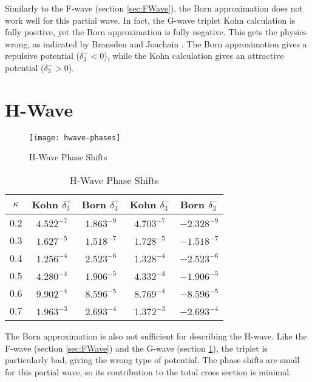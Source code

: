 \documentclass[Dissertation.tex]{subfiles}
\begin{document}
Similarly to the F-wave (section \ref{sec:FWave}), the Born approximation does not work well for this partial wave. In fact, the G-wave triplet Kohn calculation is fully positive, yet the Born approximation is fully negative. This gets the physics wrong, as indicated by Bransden and Joachain \citep[pg. 589]{Bransden2003}. The Born approximation gives a repulsive potential ($\delta_3^- < 0$), while the Kohn calculation gives an attractive potential ($\delta_3^- > 0$).


\section{H-Wave}
\label{sec:HWave}

\begin{figure}[H]
	\centering
	\texttt{[image: hwave-phases]}
	\caption{H-Wave Phase Shifts}
	\label{fig:HWavePhase}
\end{figure}

\setlength{\abovecaptionskip}{6pt}
\setlength{\belowcaptionskip}{6pt}
\begin{table}[H]
\centering
\begin{tabular}{c | c c | c c}
\toprule
$\kappa$ & Kohn $\delta_3^+$ & Born $\delta_3^+$ & Kohn $\delta_3^-$ & Born $\delta_3^-$ \\
\midrule
0.2 &	$4.522^{-7}$ & $1.863^{-9}$ & $4.703^{-7}$ & $-2.328^{-9}$ \\
0.3 &	$1.627^{-5}$ & $1.518^{-7}$ & $1.728^{-5}$ & $-1.518^{-7}$ \\
0.4 &	$1.256^{-4}$ & $2.523^{-6}$ & $1.328^{-4}$ & $-2.523^{-6}$ \\
0.5 &	$4.280^{-4}$ & $1.906^{-5}$ & $4.332^{-4}$ & $-1.906^{-5}$ \\
0.6 &	$9.902^{-4}$ & $8.596^{-5}$ & $8.769^{-4}$ & $-8.596^{-5}$ \\
0.7 &	$1.963^{-3}$ & $2.693^{-4}$ & $1.372^{-3}$ & $-2.693^{-4}$ \\
\bottomrule
\end{tabular}
\caption{H-Wave Phase Shifts}
\label{tab:HWavePhase}
\end{table}

The Born approximation is also not sufficient for describing the H-wave. Like the F-wave (section \ref{sec:FWave}) and the G-wave (section \ref{sec:HWave}), the triplet is particularly bad, giving the wrong type of potential. The phase shifts are small for this partial wave, so its contribution to the total cross section is minimal.
\end{document}
